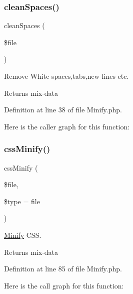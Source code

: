\subsubsection{\texorpdfstring{clean\+Spaces()}{cleanSpaces()}}
{\footnotesize\ttfamily clean\+Spaces (\begin{DoxyParamCaption}\item[{}]{\$file }\end{DoxyParamCaption})}

Remove White spaces,tabs,new lines etc.

\begin{DoxyReturn}{Returns}
mix-\/data 
\end{DoxyReturn}


Definition at line 38 of file Minify.\+php.

Here is the caller graph for this function\+:
\mbox{\label{class_zest_1_1_common_1_1_minify_a6be8a6de16be3723cd39f4b41807f1d5}} 
\subsubsection{\texorpdfstring{css\+Minify()}{cssMinify()}}
{\footnotesize\ttfamily css\+Minify (\begin{DoxyParamCaption}\item[{}]{\$file,  }\item[{}]{\$type = {\ttfamily \textquotesingle{}file\textquotesingle{}} }\end{DoxyParamCaption})}

\mbox{\hyperlink{class_zest_1_1_common_1_1_minify}{Minify}} C\+SS.

\begin{DoxyReturn}{Returns}
mix-\/data 
\end{DoxyReturn}


Definition at line 85 of file Minify.\+php.

Here is the call graph for this function\+:
\mbox{\label{class_zest_1_1_common_1_1_minify_a7d9a8f37e357aea7b32979d653e008a7}} 
